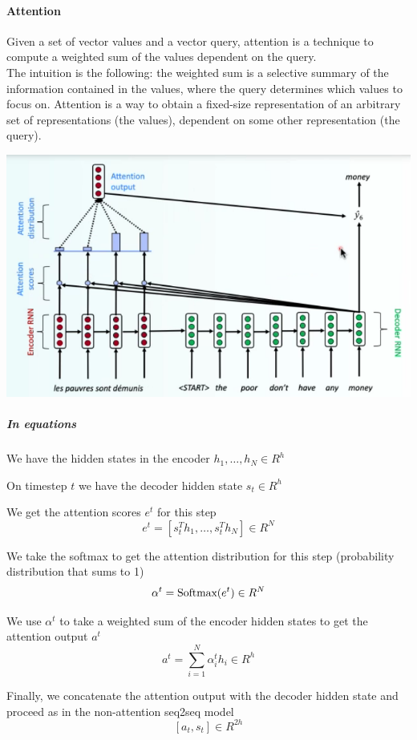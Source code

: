 \documentclass[10pt]{report}
\begin{document}
\paragraph{Attention} Given a set of vector values and a vector query, attention is a technique to compute a weighted sum of the values dependent on the query.\\
The intuition is the following: the weighted sum is a selective summary of the information contained in the values, where the query determines which values to focus on. Attention is a way to obtain a fixed-size representation of an arbitrary set of representations (the values), dependent on some other representation (the query).
\begin{center}
	\includegraphics[scale=0.6]{67.png}
\end{center}
\subparagraph{In equations}\begin{list}{}{}
	\item We have the hidden states in the encoder $h_1,\ldots,h_N\in R^h$
	\item On timestep $t$ we have the decoder hidden state $s_t \in R^h$
	\item We get the attention scores $e^t$ for this step 
	$$e^t=[s_t^Th_1,\ldots,s_t^Th_N]\in R^N$$
	\item We take the softmax to get the attention distribution for this step (probability distribution that sums to 1)
	$$\alpha^t=\hbox{Softmax}(e^t) \in R^N$$
	\item We use $\alpha^t$ to take a weighted sum of the encoder hidden states to get the attention output $a^t$
	$$a^t = \sum_{i=1}^N \alpha_i^th_i\in R^h$$
	\item Finally, we concatenate the attention output with the decoder hidden state and proceed as in the non-attention seq2seq model
	$$[a_t, s_t]\in R^{2h}$$
\end{list}
\end{document}

